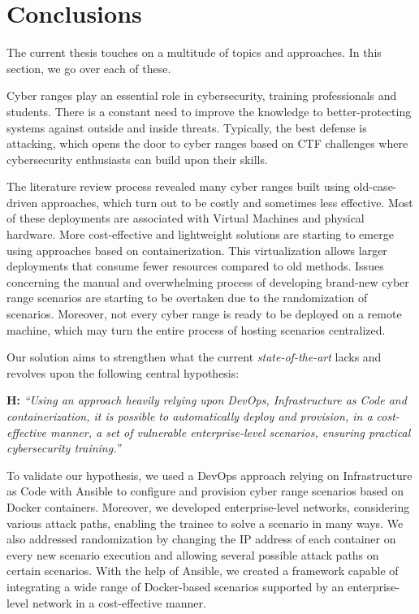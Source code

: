 \chapter{Conclusions}\label{chap:conclusion}

\minitoc

\hfill

The current thesis touches on a multitude of topics and approaches. In this section, we go over each of these.

Cyber ranges play an essential role in cybersecurity, training professionals and students. There is a constant need to improve the knowledge to better-protecting systems against outside and inside threats. Typically, the best defense is attacking, which opens the door to cyber ranges based on CTF challenges where cybersecurity enthusiasts can build upon their skills.

The literature review process revealed many cyber ranges built using old-case-driven approaches, which turn out to be costly and sometimes less effective. Most of these deployments are associated with Virtual Machines and physical hardware. More cost-effective and lightweight solutions are starting to emerge using approaches based on containerization. This virtualization allows larger deployments that consume fewer resources compared to old methods. Issues concerning the manual and overwhelming process of developing brand-new cyber range scenarios are starting to be overtaken due to the randomization of scenarios. Moreover, not every cyber range is ready to be deployed on a remote machine, which may turn the entire process of hosting scenarios centralized.

Our solution aims to strengthen what the current \textit{state-of-the-art} lacks and revolves upon the following central hypothesis:\\

\leftskip=1.25cm\rightskip=1.25cm

\textbf{H:} \textit{``Using an approach heavily relying upon DevOps, Infrastructure as Code and containerization, it is possible to automatically deploy and provision, in a cost-effective manner, a set of vulnerable enterprise-level scenarios, ensuring practical cybersecurity training.''}\\

\leftskip=0cm\rightskip=0cm

To validate our hypothesis, we used a DevOps approach relying on Infrastructure as Code with Ansible to configure and provision cyber range scenarios based on Docker containers. Moreover, we developed enterprise-level networks, considering various attack paths, enabling the trainee to solve a scenario in many ways. We also addressed randomization by changing the IP address of each container on every new scenario execution and allowing several possible attack paths on certain scenarios. With the help of Ansible, we created a framework capable of integrating a wide range of Docker-based scenarios supported by an enterprise-level network in a cost-effective manner.

